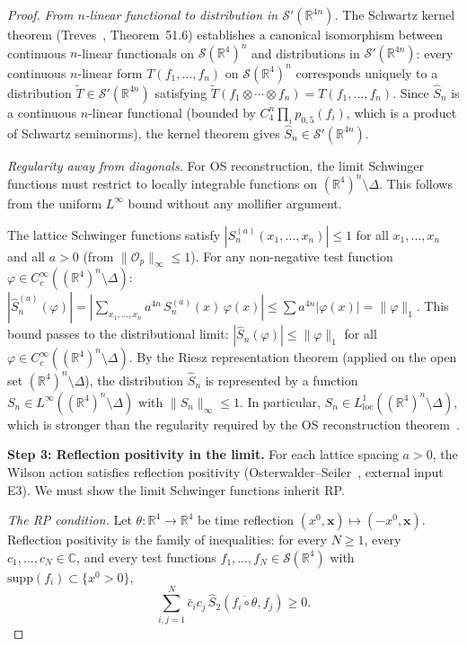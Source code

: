 \documentclass[11pt]{article}
\theoremstyle{definition}
\newcommand{\R}{\mathbb{R}}
\begin{document}
\begin{proof}
\emph{From $n$-linear functional to distribution in
$\mathcal{S}'(\R^{4n})$.}
The Schwartz kernel theorem
(Treves~\cite{Treves}, Theorem~51.6)
establishes a canonical isomorphism between continuous
$n$-linear functionals on $\mathcal{S}(\R^4)^n$ and
distributions in $\mathcal{S}'(\R^{4n})$: every
continuous $n$-linear form $T(f_1,\ldots,f_n)$ on
$\mathcal{S}(\R^4)^n$ corresponds uniquely to a
distribution $\tilde T\in\mathcal{S}'(\R^{4n})$ satisfying
$\tilde T(f_1\otimes\cdots\otimes f_n)=T(f_1,\ldots,f_n)$.
Since $\hat S_n$ is a continuous $n$-linear functional
(bounded by $C_4^n\prod_i p_{0,5}(f_i)$, which is a
product of Schwartz seminorms), the kernel theorem gives
$\hat S_n\in\mathcal{S}'(\R^{4n})$.

\emph{Regularity away from diagonals.}
For OS reconstruction, the limit Schwinger functions must
restrict to locally integrable functions on
$(\R^4)^n\setminus\Delta$.  This follows from the
uniform $L^\infty$ bound without any mollifier argument.

The lattice Schwinger functions satisfy
$|S_n^{(a)}(x_1,\ldots,x_n)|\le 1$ for all
$x_1,\ldots,x_n$ and all $a>0$ (from $\|\mathcal{O}_p\|_\infty
\le 1$).  For any non-negative test function
$\varphi\in C_c^\infty((\R^4)^n\setminus\Delta)$:
$|\hat S_n^{(a)}(\varphi)|
=|\sum_{x_1,\ldots,x_n}a^{4n}\,S_n^{(a)}(x)\,\varphi(x)|
\le\sum a^{4n}|\varphi(x)|=\|\varphi\|_1$.
This bound passes to the distributional limit:
$|\hat S_n(\varphi)|\le\|\varphi\|_1$ for all
$\varphi\in C_c^\infty((\R^4)^n\setminus\Delta)$.
By the Riesz representation theorem (applied on the open
set $(\R^4)^n\setminus\Delta$), the distribution $\hat S_n$
is represented by a function
$S_n\in L^\infty((\R^4)^n\setminus\Delta)$ with
$\|S_n\|_\infty\le 1$.  In particular,
$S_n\in L^1_{\mathrm{loc}}((\R^4)^n\setminus\Delta)$,
which is stronger than the regularity required by the
OS reconstruction theorem~\cite{OS73}.

\textbf{Step 3: Reflection positivity in the limit.}
For each lattice spacing $a>0$, the Wilson action
satisfies reflection positivity
(Osterwalder--Seiler~\cite{OS78}, external input E3).
We must show the limit Schwinger functions inherit RP.

\emph{The RP condition.}
Let $\theta:\R^4\to\R^4$ be time reflection
$(x^0,\mathbf{x})\mapsto(-x^0,\mathbf{x})$.
Reflection positivity is the family of inequalities:
for every $N\ge 1$, every $c_1,\ldots,c_N\in\mathbb{C}$,
and every test functions $f_1,\ldots,f_N\in
\mathcal{S}(\R^4)$ with $\mathrm{supp}(f_i)
\subset\{x^0>0\}$,
\begin{equation}\label{eq:RP-ineq}
\sum_{i,j=1}^N\bar c_i c_j\,
\hat S_2(\overline{f_i\circ\theta},f_j)\ge 0.
\end{equation}


\end{proof}
\end{document}

